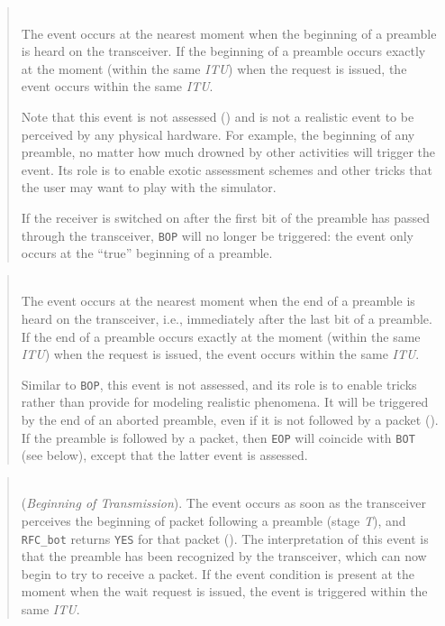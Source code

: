\begin{quote}
\noindent{}\\ \hspace{0in}
The event occurs at the nearest moment when the beginning of a preamble
is heard on the transceiver.
If the beginning of a preamble occurs exactly at the moment (within the
same {\em ITU\/}) when the request is issued, the event occurs within the
same {\em ITU}.

\medskip
Note that this event is not assessed () and is not a
realistic event to be perceived by any physical hardware.
For example, the beginning of any preamble, no matter how much
drowned by other activities will trigger the event.
Its role is to enable exotic assessment schemes and other tricks that the
user may want to play with the simulator.

\noindent
If the receiver is switched on after the first bit of the preamble has
passed through the transceiver, {\tt BOP} will no longer be triggered:
the event only occurs at the ``true'' beginning of a preamble.
\end{quote}

\begin{quote}
\noindent{}\\ \hspace{0in}
The event occurs at the nearest moment when the end of a preamble
is heard on the transceiver, i.e., immediately after the last bit
of a preamble.
If the end of a preamble occurs exactly at the moment (within the
same {\em ITU\/}) when the request is issued, the event occurs within the
same {\em ITU}.

\medskip
Similar to {\tt BOP}, this event is not assessed, and its role is to
enable tricks rather than provide for modeling realistic phenomena.
It will be triggered by the end of an aborted preamble,
even if it is not followed by a packet ().
If the preamble is followed by a packet, then {\tt EOP} will coincide with
{\tt BOT} (see below), except that the latter event is assessed.
\end{quote}

\begin{quote}
\noindent{}\\ \hspace{0in}
({\em Beginning of Transmission\/}).
The event occurs as soon as the transceiver perceives the beginning of packet
following a preamble (stage {\em T\/}),
and {\tt RFC\_bot} returns {\tt YES} for that packet
().
The interpretation of this event is that the preamble has been recognized
by the transceiver, which can now begin to try to receive a packet.
If the event condition is present at the moment when the wait request is
issued, the event is triggered within the same {\em ITU}.
\end{quote}

